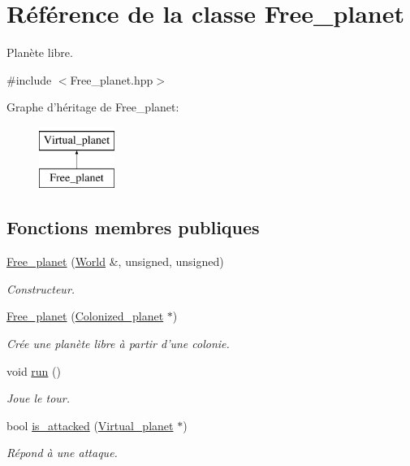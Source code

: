 \hypertarget{classFree__planet}{\section{Référence de la classe Free\-\_\-planet}
\label{classFree__planet}
}


Planète libre.  




{\ttfamily \#include $<$Free\-\_\-planet.\-hpp$>$}

Graphe d'héritage de Free\-\_\-planet\-:\begin{figure}[H]
\begin{center}
\leavevmode
\includegraphics[height=2.000000cm]{classFree__planet}
\end{center}
\end{figure}
\subsection*{Fonctions membres publiques}
\begin{DoxyCompactItemize}
\item 
\hyperlink{classFree__planet_a7dfd0b5e9f41d84aba7ff721ec7a148e}{Free\-\_\-planet} (\hyperlink{classWorld}{World} \&, unsigned, unsigned)
\begin{DoxyCompactList}\small\item\em Constructeur. \end{DoxyCompactList}\item 
\hyperlink{classFree__planet_a40c231f6f967b35b0c13cb9f883bafe2}{Free\-\_\-planet} (\hyperlink{classColonized__planet}{Colonized\-\_\-planet} $\ast$)
\begin{DoxyCompactList}\small\item\em Crée une planète libre à partir d'une colonie. \end{DoxyCompactList}\item 
void \hyperlink{classFree__planet_a5ca63c483955025b2955eb35fea0f4e8}{run} ()
\begin{DoxyCompactList}\small\item\em Joue le tour. \end{DoxyCompactList}\item 
bool \hyperlink{classFree__planet_a205f5d75e430e9884b950b7bc1a3fe9d}{is\-\_\-attacked} (\hyperlink{classVirtual__planet}{Virtual\-\_\-planet} $\ast$)
\begin{DoxyCompactList}\small\item\em Répond à une attaque. \end{DoxyCompactList}\end{DoxyCompactItemize}
